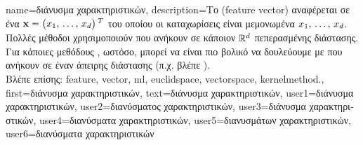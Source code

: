 {name={\foreignlanguage{greek}{διάνυσμα χαρακτηριστικών}},
	description={\foreignlanguage{greek}{Το}  
		 (feature vector) \foreignlanguage{greek}{αναφέρεται σε ένα}  
		${\bf x} = \big(x_{1}, \,\ldots, \,x_{d}\big)\,^{T}$ \foreignlanguage{greek}{του οποίου οι καταχωρίσεις είναι μεμονωμένα} 
		 $x_{1}, \,\ldots, \,x_{d}$. 
		\foreignlanguage{greek}{Πολλές μέθοδοι}  \foreignlanguage{greek}{χρησιμοποιούν}  
		 \foreignlanguage{greek}{που ανήκουν σε κάποιον}  $\mathbb{R}^{d}$
		\foreignlanguage{greek}{πεπερασμένης διάστασης. Για κάποιες μεθόδους} , \foreignlanguage{greek}{ωστόσο, 
		μπορεί να είναι πιο βολικό να δουλεύουμε με}   \foreignlanguage{greek}{που ανήκουν σε 
		έναν}  \foreignlanguage{greek}{άπειρης διάστασης (π.χ. βλέπε} ).
		\\
		\foreignlanguage{greek}{Βλέπε επίσης:} \gls{feature}, \gls{vector}, \gls{ml}, \gls{euclidspace}, \gls{vectorspace}, \gls{kernelmethod}.}, 
	first={\foreignlanguage{greek}{διάνυσμα χαρακτηριστικών}},
	text={\foreignlanguage{greek}{διάνυσμα χαρακτηριστικών}},
	user1={\foreignlanguage{greek}{διάνυσμα χαρακτηριστικών}}, %
  	user2={\foreignlanguage{greek}{διανύσματος χαρακτηριστικών}}, %
	user3={\foreignlanguage{greek}{διάνυσμα χαρακτηριστικών}}, %
	user4={\foreignlanguage{greek}{διανύσματα χαρακτηριστικών}}, %
  	user5={\foreignlanguage{greek}{διανυσμάτων χαρακτηριστικών}}, %
	user6={\foreignlanguage{greek}{διανύσματα χαρακτηριστικών}} %
}

